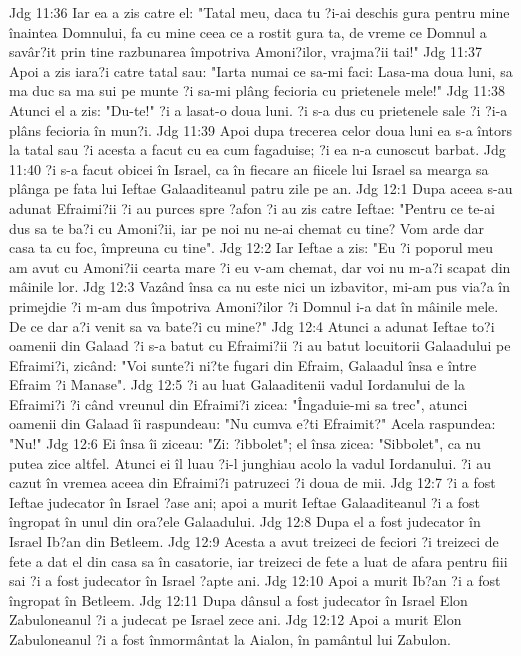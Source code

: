 Jdg 11:36  Iar ea a zis catre el: "Tatal meu, daca tu ?i-ai deschis gura pentru mine înaintea Domnului, fa cu mine ceea ce a rostit gura ta, de vreme ce Domnul a savâr?it prin tine razbunarea împotriva Amoni?ilor, vrajma?ii tai!"
Jdg 11:37  Apoi a zis iara?i catre tatal sau: "Iarta numai ce sa-mi faci: Lasa-ma doua luni, sa ma duc sa ma sui pe munte ?i sa-mi plâng fecioria cu prietenele mele!"
Jdg 11:38  Atunci el a zis: "Du-te!" ?i a lasat-o doua luni. ?i s-a dus cu prietenele sale ?i ?i-a plâns fecioria în mun?i.
Jdg 11:39  Apoi dupa trecerea celor doua luni ea s-a întors la tatal sau ?i acesta a facut cu ea cum fagaduise; ?i ea n-a cunoscut barbat.
Jdg 11:40  ?i s-a facut obicei în Israel, ca în fiecare an fiicele lui Israel sa mearga sa plânga pe fata lui Ieftae Galaaditeanul patru zile pe an.
Jdg 12:1  Dupa aceea s-au adunat Efraimi?ii ?i au purces spre ?afon ?i au zis catre Ieftae: "Pentru ce te-ai dus sa te ba?i cu Amoni?ii, iar pe noi nu ne-ai chemat cu tine? Vom arde dar casa ta cu foc, împreuna cu tine".
Jdg 12:2  Iar Ieftae a zis: "Eu ?i poporul meu am avut cu Amoni?ii cearta mare ?i eu v-am chemat, dar voi nu m-a?i scapat din mâinile lor.
Jdg 12:3  Vazând însa ca nu este nici un izbavitor, mi-am pus via?a în primejdie ?i m-am dus împotriva Amoni?ilor ?i Domnul i-a dat în mâinile mele. De ce dar a?i venit sa va bate?i cu mine?"
Jdg 12:4  Atunci a adunat Ieftae to?i oamenii din Galaad ?i s-a batut cu Efraimi?ii ?i au batut locuitorii Galaadului pe Efraimi?i, zicând: "Voi sunte?i ni?te fugari din Efraim, Galaadul însa e între Efraim ?i Manase".
Jdg 12:5  ?i au luat Galaaditenii vadul Iordanului de la Efraimi?i ?i când vreunul din Efraimi?i zicea: "Îngaduie-mi sa trec", atunci oamenii din Galaad îi raspundeau: "Nu cumva e?ti Efraimit?" Acela raspundea: "Nu!"
Jdg 12:6  Ei însa îi ziceau: "Zi: ?ibbolet"; el însa zicea: "Sibbolet", ca nu putea zice altfel. Atunci ei îl luau ?i-l junghiau acolo la vadul Iordanului. ?i au cazut în vremea aceea din Efraimi?i patruzeci ?i doua de mii.
Jdg 12:7  ?i a fost Ieftae judecator în Israel ?ase ani; apoi a murit Ieftae Galaaditeanul ?i a fost îngropat în unul din ora?ele Galaadului.
Jdg 12:8  Dupa el a fost judecator în Israel Ib?an din Betleem.
Jdg 12:9  Acesta a avut treizeci de feciori ?i treizeci de fete a dat el din casa sa în casatorie, iar treizeci de fete a luat de afara pentru fiii sai ?i a fost judecator în Israel ?apte ani.
Jdg 12:10  Apoi a murit Ib?an ?i a fost îngropat în Betleem.
Jdg 12:11  Dupa dânsul a fost judecator în Israel Elon Zabuloneanul ?i a judecat pe Israel zece ani.
Jdg 12:12  Apoi a murit Elon Zabuloneanul ?i a fost înmormântat la Aialon, în pamântul lui Zabulon.
